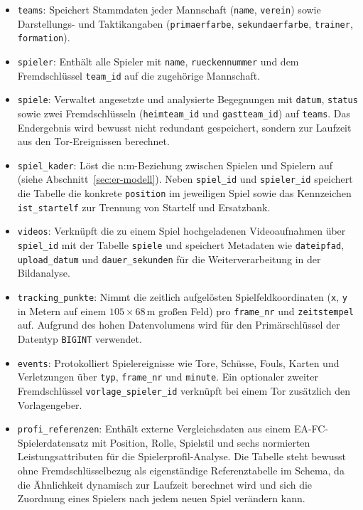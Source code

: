 \begin{itemize}
    \item \texttt{teams}: Speichert Stammdaten jeder Mannschaft (\texttt{name},
    \texttt{verein}) sowie Darstellungs- und Taktikangaben
    (\texttt{primaerfarbe}, \texttt{sekundaerfarbe}, \texttt{trainer},
    \texttt{formation}).
    \item \texttt{spieler}: Enthält alle Spieler mit \texttt{name},
    \texttt{rueckennummer} und dem Fremdschlüssel \texttt{team\_id} auf die
    zugehörige Mannschaft.
    \item \texttt{spiele}: Verwaltet angesetzte und analysierte Begegnungen mit
    \texttt{datum}, \texttt{status} sowie zwei Fremdschlüsseln
    (\texttt{heimteam\_id} und \texttt{gastteam\_id}) auf \texttt{teams}. Das
    Endergebnis wird bewusst nicht redundant gespeichert, sondern zur Laufzeit
    aus den Tor-Ereignissen berechnet.
    \item \texttt{spiel\_kader}: Löst die n:m-Beziehung zwischen Spielen und
    Spielern auf (siehe Abschnitt~\ref{sec:er-modell}). Neben \texttt{spiel\_id}
    und \texttt{spieler\_id} speichert die Tabelle die konkrete
    \texttt{position} im jeweiligen Spiel sowie das Kennzeichen
    \texttt{ist\_startelf} zur Trennung von Startelf und Ersatzbank.
    \item \texttt{videos}: Verknüpft die zu einem Spiel hochgeladenen
    Videoaufnahmen über \texttt{spiel\_id} mit der Tabelle \texttt{spiele} und
    speichert Metadaten wie \texttt{dateipfad}, \texttt{upload\_datum} und
    \texttt{dauer\_sekunden} für die Weiterverarbeitung in der Bildanalyse.
    \item \texttt{tracking\_punkte}: Nimmt die zeitlich aufgelösten
    Spielfeldkoordinaten (\texttt{x}, \texttt{y} in Metern auf einem
    $105 \times 68$\,m großen Feld) pro \texttt{frame\_nr} und
    \texttt{zeitstempel} auf. Aufgrund des hohen Datenvolumens wird für den
    Primärschlüssel der Datentyp \texttt{BIGINT} verwendet.
    \item \texttt{events}: Protokolliert Spielereignisse wie Tore, Schüsse,
    Fouls, Karten und Verletzungen über \texttt{typ}, \texttt{frame\_nr} und
    \texttt{minute}. Ein optionaler zweiter Fremdschlüssel
    \texttt{vorlage\_spieler\_id} verknüpft bei einem Tor zusätzlich den
    Vorlagengeber.
    \item \texttt{profi\_referenzen}: Enthält externe Vergleichsdaten aus einem
    EA-FC-Spielerdatensatz mit Position, Rolle, Spielstil und sechs normierten
    Leistungsattributen für die Spielerprofil-Analyse. Die Tabelle steht
    bewusst ohne Fremdschlüsselbezug als eigenständige Referenztabelle im
    Schema, da die Ähnlichkeit dynamisch zur Laufzeit berechnet wird und sich
    die Zuordnung eines Spielers nach jedem neuen Spiel verändern kann.
\end{itemize}


